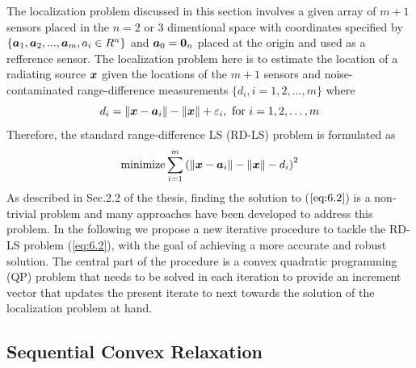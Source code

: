 The localization problem discussed in this section involves a given array of $m+1$ sensors placed in the $n = 2$ or 3 dimentional space with coordinates specified by $\{\mbox{\boldmath$a$}_1, \mbox{\boldmath$a$}_2, . . . , \mbox{\boldmath$a$}_m , a_i \in R^n\}$ and  $\mbox{\boldmath$a$}_0 = \mbox{\boldmath${0}$}_n$ placed at the origin and used as a refference sensor. The localization problem here is to estimate the location of a radiating source $\mbox{\boldmath$x$}$ given the locations of the $m+1$ sensors and noise-contaminated range-difference measurements $\{d_i, i = 1, 2, \ldots, m\}$ where 
\setcounter{abc}{0}
\begin{equation} \label{eq:6.1}
d_i = \|\mbox{\boldmath$x$} - \mbox{\boldmath$a$}_i\| - \|\mbox{\boldmath$x$}\| + \varepsilon_i, \mbox{ for } i = 1, 2, \ldots, m
\end{equation}
Therefore, the standard range-difference LS (RD-LS) problem is formulated as
\begin{equation} \label{eq:6.2}
\mathop{\mbox{minimize}} \sum^m_{i=1}\left( \|\mbox{\boldmath$x$} - \mbox{\boldmath$a$}_i\| - \|\mbox{\boldmath$x$}\| - d_i\right)^2
\end{equation}
As described in Sec.2.2 of the thesis, finding the solution to ($\ref{eq:6.2}$) is a non-trivial problem and many approaches have been developed to address this problem. In the following we propose a new iterative procedure to tackle the RD-LS problem (\ref{eq:6.2}), with the goal of achieving a more accurate and robust solution. The central part of the procedure is a convex quadratic programming (QP) problem that needs to be solved in each iteration to provide an increment vector that updates the present iterate to next towards the solution of the localization problem at hand.

\subsection{Sequential Convex Relaxation}

%
%
%

